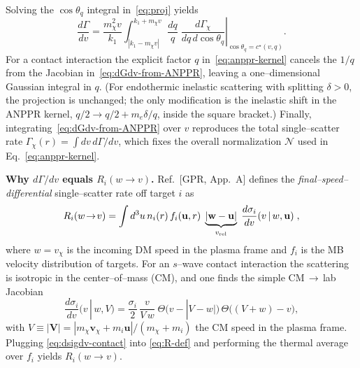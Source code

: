 \documentclass[13.1pt, letterpaper, twoside]{article}
\begin{document}
Solving the $\cos\theta_q$ integral in~\eqref{eq:proj} yields
\begin{equation*}
    \label{eq:dGdv-from-ANPPR}
    \frac{d\Gamma}{dv}
    =\frac{m_\chi^2 v}{k_1}
     \int_{|k_1-m_\chi v|}^{k_1+m_\chi v}\frac{dq}{q}\;
     \left.\frac{d\Gamma_\chi}{dq\,d\cos\theta_q}\right|_{\cos\theta_q=c^\star(v,q)} .
\end{equation*}
For a contact interaction the explicit factor $q$ in~\eqref{eq:anppr-kernel} cancels the $1/q$
from the Jacobian in~\eqref{eq:dGdv-from-ANPPR}, leaving a one–dimensional Gaussian integral in $q$.
(For endothermic inelastic scattering with splitting $\delta>0$, the projection is unchanged; the only
modification is the inelastic shift in the ANPPR kernel, $q/2\to q/2 + m_e\delta/q$, inside the square bracket.)
Finally, integrating~\eqref{eq:dGdv-from-ANPPR} over $v$ reproduces the total single–scatter rate
$\Gamma_\chi(r)=\int dv\,d\Gamma/dv$, which fixes the overall normalization $\mathcal N$ used in
Eq.~\eqref{eq:anppr-kernel}.

\medskip
\noindent\textbf{Why $d\Gamma/dv$ equals $R_i(w\!\to\! v)$.}
Ref.~[GPR, App.~A] defines the \emph{final–speed–differential} single–scatter rate off target $i$ as
\begin{equation}
    \label{eq:R-def}
    R_i(w\!\to\! v)
    =\int d^3u\, n_i(r)\,f_i(\mathbf u,r)\;
    \underbrace{|\mathbf w-\mathbf u|}_{v_{\rm rel}}\;
    \frac{d\sigma_i}{dv}(v\,|\,w,\mathbf u)\;,
\end{equation}
where $w=v_\chi$ is the incoming DM speed in the plasma frame and $f_i$ is the MB velocity distribution of targets. For an $s$–wave contact interaction the scattering is isotropic in the center–of–mass (CM), and one finds the simple CM\,$\to$\,lab Jacobian
\begin{equation}
    \label{eq:dsigdv-contact}
    \frac{d\sigma_i}{dv}(v\,|\,w,V)
    =\frac{\sigma_{i}}{2}\,\frac{v}{V\,w}\;
    \Theta\!\big(v-|V-w|\big)\,
    \Theta\!\big((V+w)-v\big),
\end{equation}
with $V\equiv|\mathbf V|=|m_\chi\mathbf v_\chi+m_i\mathbf u|/(m_\chi+m_i)$ the CM speed in the plasma frame. Plugging \eqref{eq:dsigdv-contact} into \eqref{eq:R-def} and performing the thermal average over $f_i$ yields $R_i(w\!\to\! v)$.
\end{document}
